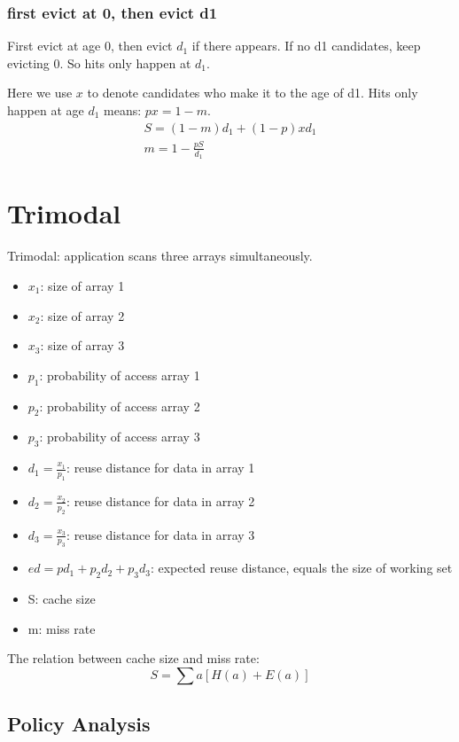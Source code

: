 \documentclass[12pt, letterpaper]{article}
\begin{document}
\subsubsection{first evict at 0, then evict d1}
First evict at age 0, then evict $d_1$ if there appears. If no d1 candidates,
keep evicting 0. So hits only happen at $d_1$.

Here we use $x$ to denote candidates who make it to the age of d1. Hits only
happen at age $d_1$ means: $px = 1-m$.
\begin{equation}
\begin{gathered}
S = (1-m) d_1 + (1-p) x d_1 \\
m = 1 - \frac{pS}{d_1}
\end{gathered}
\end{equation}

\section{Trimodal}

Trimodal: application scans three arrays simultaneously.

\begin{itemize}
\item $x_1$: size of array 1
\item $x_2$: size of array 2
\item $x_3$: size of array 3
\item $p_1$: probability of access array 1
\item $p_2$: probability of access array 2
\item $p_3$: probability of access array 3
\item $d_1 = \frac{x_1}{p_1}$: reuse distance for data in array 1
\item $d_2 = \frac{x_2}{p_2}$: reuse distance for data in array 2
\item $d_3 = \frac{x_3}{p_3}$: reuse distance for data in array 3
\item $ed = p d_1 + p_2 d_2 + p_3 d_3 $: expected reuse distance, equals the
size of working set 
\item S: cache size
\item m: miss rate
\end{itemize}

The relation between cache size and miss rate:
\begin{equation}
S = \sum a [H(a) + E(a)]
\end{equation}

\subsection{Policy Analysis}
\end{document}

